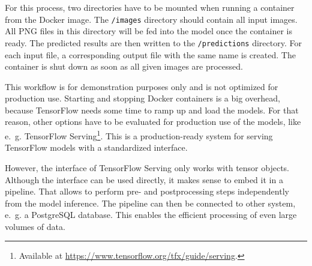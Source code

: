 For this process, two directories have to be mounted when running a container from the Docker image. The \texttt{/images} directory should contain all input images. All PNG files in this directory will be fed into the model once the container is ready. The predicted results are then written to the \texttt{/predictions} directory. For each input file, a corresponding output file with the same name is created. The container is shut down as soon as all given images are processed.

This workflow is for demonstration purposes only and is not optimized for production use. Starting and stopping Docker containers is a big overhead, because TensorFlow needs some time to ramp up and load the models. For that reason, other options have to be evaluated for production use of the models, like e.~g. TensorFlow Serving\footnote{Available at \url{https://www.tensorflow.org/tfx/guide/serving}.}. This is a production-ready system for serving TensorFlow models with a standardized interface.

However, the interface of TensorFlow Serving only works with tensor objects. Although the interface can be used directly, it makes sense to embed it in a pipeline. That allows to perform pre- and postprocessing steps independently from the model inference. The pipeline can then be connected to other system, e.~g. a PostgreSQL database. This enables the efficient processing of even large volumes of data.

\newpage
